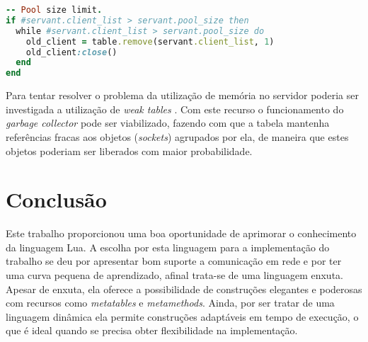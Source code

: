 \documentclass[11pt]{article}
\begin{document}
\begin{lstlisting}[label={connpool},language=Ruby,caption=Connection Pool]
-- Pool size limit.
if #servant.client_list > servant.pool_size then
  while #servant.client_list > servant.pool_size do
    old_client = table.remove(servant.client_list, 1)
    old_client:close()
  end
end
\end{lstlisting}

Para tentar resolver o problema da utilização de memória no servidor poderia ser
investigada a utilização de \textit{weak tables} \cite{weakt}. Com este recurso
o funcionamento do \textit{garbage collector} pode ser viabilizado, fazendo com
que a tabela mantenha referências fracas aos objetos (\textit{sockets})
agrupados por ela, de maneira que estes objetos poderiam ser liberados com maior
probabilidade.

\section{Conclusão}\label{sec:conclusion}

Este trabalho proporcionou uma boa oportunidade de aprimorar o conhecimento da
linguagem Lua. A escolha por esta linguagem para a implementação do trabalho se
deu por apresentar bom suporte a comunicação em rede e por ter uma curva pequena
de aprendizado, afinal trata-se de uma linguagem enxuta. Apesar de enxuta, ela
oferece a possibilidade de construções elegantes e poderosas com recursos como
\textit{metatables} e \textit{metamethods}. Ainda, por ser tratar de uma
linguagem dinâmica ela permite construções adaptáveis em tempo de execução, o
que é ideal quando se precisa obter flexibilidade na implementação.



\end{document}

